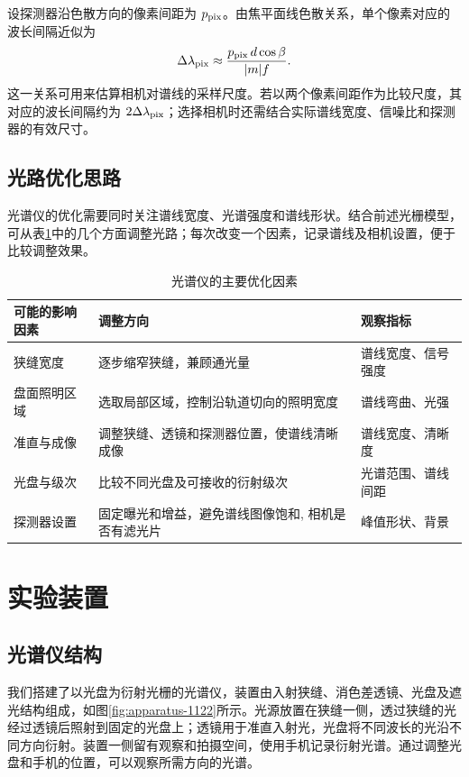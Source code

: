 \documentclass[UTF8,a4paper,12pt]{ctexart}
\begin{document}
设探测器沿色散方向的像素间距为 $p_{\rm pix}$。由焦平面线色散关系，单个像素对应的波长间隔近似为
\begin{equation}
  \Delta\lambda_{\rm pix}\approx
  \frac{p_{\rm pix}\,d\cos\beta}{|m|f}.
\end{equation}
这一关系可用来估算相机对谱线的采样尺度。若以两个像素间距作为比较尺度，其对应的波长间隔约为 $2\Delta\lambda_{\rm pix}$；选择相机时还需结合实际谱线宽度、信噪比和探测器的有效尺寸。

\subsection{光路优化思路}
光谱仪的优化需要同时关注谱线宽度、光谱强度和谱线形状。结合前述光栅模型，可从表\ref{tab:optimization}中的几个方面调整光路；每次改变一个因素，记录谱线及相机设置，便于比较调整效果。

\begin{table}[H]
  \centering
  \caption{光谱仪的主要优化因素}
  \label{tab:optimization}
  \begin{tabular}{p{}p{}p{}}
    \toprule
    可能的影响因素 & 调整方向 & 观察指标 \\
    \midrule
    狭缝宽度 & 逐步缩窄狭缝，兼顾通光量 & 谱线宽度、信号强度 \\
    盘面照明区域 & 选取局部区域，控制沿轨道切向的照明宽度 & 谱线弯曲、光强 \\
    准直与成像 & 调整狭缝、透镜和探测器位置，使谱线清晰成像 & 谱线宽度、清晰度 \\
    光盘与级次 & 比较不同光盘及可接收的衍射级次 & 光谱范围、谱线间距 \\
    探测器设置 & 固定曝光和增益，避免谱线图像饱和, 相机是否有滤光片 & 峰值形状、背景 \\
    \bottomrule
  \end{tabular}
\end{table}


\section{实验装置}
\subsection{光谱仪结构}
我们搭建了以光盘为衍射光栅的光谱仪，装置由入射狭缝、消色差透镜、光盘及遮光结构组成，如图\ref{fig:apparatus-1122}所示。光源放置在狭缝一侧，透过狭缝的光经过透镜后照射到固定的光盘上；透镜用于准直入射光，光盘将不同波长的光沿不同方向衍射。装置一侧留有观察和拍摄空间，使用手机记录衍射光谱。通过调整光盘和手机的位置，可以观察所需方向的光谱。
\end{document}
